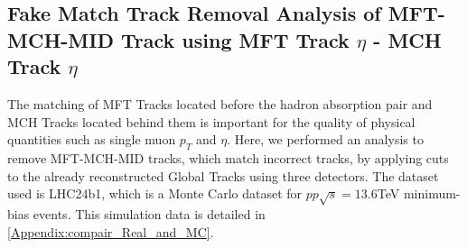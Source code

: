             \subsection{Fake Match Track Removal Analysis of MFT-MCH-MID Track using MFT Track $\eta$ - MCH Track $\eta$}
            \label{Analysis:Matching}
                The matching of MFT Tracks located before the hadron absorption pair and MCH Tracks located behind them is important for the quality of physical quantities such as single muon $p_T$ and $\eta$. Here, we performed an analysis to remove MFT-MCH-MID tracks, which match incorrect tracks, by applying cuts to the already reconstructed Global Tracks using three detectors. The dataset used is LHC24b1, which is a Monte Carlo dataset for $pp\sqrt{s}=13.6$TeV minimum-bias events. This simulation data is detailed in \ref{Appendix:compair_Real_and_MC}.
                
